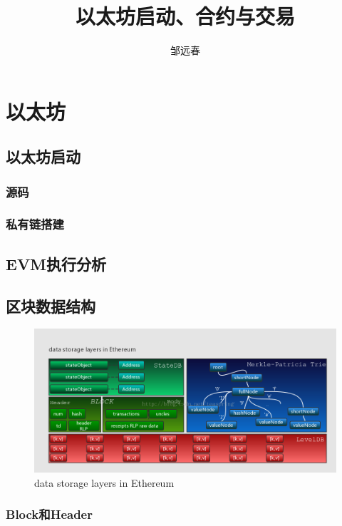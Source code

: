 \documentclass[UTF8]{ctexart}
\title{以太坊启动、合约与交易}
\author{邹远春}
\date{}
\begin{document}
\maketitle
\newcommand\Emph{\textbf}
\else
\chapter{以太坊}
\fi
\section{以太坊启动}

\subsection{源码}

\subsection{私有链搭建}

\section{EVM执行分析}

\section{区块数据结构}

\begin{figure}
	\centering
	\includegraphics[scale=0.45]{data_storage.png}
	\caption{data storage layers in Ethereum}
	\label{dataStorage}
\end{figure}

\subsection{Block和Header}
\end{document}
